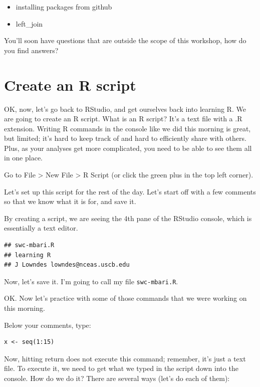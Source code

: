 \documentclass[]{book}
\providecommand{\tightlist}{%
  \setlength{\itemsep}{0pt}\setlength{\parskip}{0pt}}
\theoremstyle{definition}
\theoremstyle{definition}
\theoremstyle{definition}
\theoremstyle{remark}
\begin{document}
\begin{itemize}
\tightlist
\item
  installing packages from github
\item
  left\_join
\end{itemize}

You'll soon have questions that are outside the scope of this workshop,
how do you find answers?

\section{Create an R script}\label{create-an-r-script}

OK, now, let's go back to RStudio, and get ourselves back into learning
R. We are going to create an R script. What is an R script? It's a text
file with a .R extension. Writing R commands in the console like we did
this morning is great, but limited; it's hard to keep track of and hard
to efficiently share with others. Plus, as your analyses get more
complicated, you need to be able to see them all in one place.

Go to File \textgreater{} New File \textgreater{} R Script (or click the
green plus in the top left corner).

Let's set up this script for the rest of the day. Let's start off with a
few comments so that we know what it is for, and save it.

By creating a script, we are seeing the 4th pane of the RStudio console,
which is essentially a text editor.

\begin{verbatim}
## swc-mbari.R
## learning R
## J Lowndes lowndes@nceas.uscb.edu
\end{verbatim}

Now, let's save it. I'm going to call my file \texttt{swc-mbari.R}.

OK. Now let's practice with some of those commands that we were working
on this morning.

Below your comments, type:

\begin{verbatim}
x <- seq(1:15)
\end{verbatim}

Now, hitting return does not execute this command; remember, it's just a
text file. To execute it, we need to get what we typed in the script
down into the console. How do we do it? There are several ways (let's do
each of them):
\end{document}
